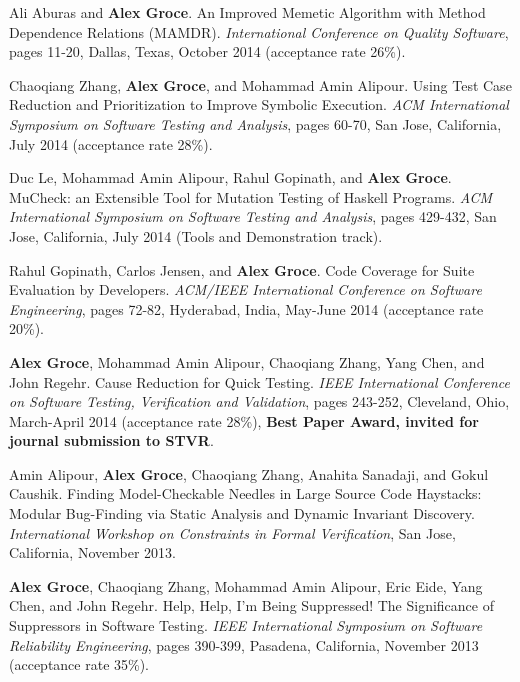 \documentclass[ComputerScience]{vita}
\begin{document}
\begin{vita}
\begin{Refereed Conference and Workshop Publications}
\item
Ali Aburas and {\bf Alex Groce}.
\newblock An Improved Memetic Algorithm with Method Dependence Relations (MAMDR).
\newblock \emph{International Conference on Quality Software}, pages 11-20, Dallas, Texas, October 2014 (acceptance rate 26\%).

\item
Chaoqiang Zhang, {\bf Alex Groce}, and Mohammad Amin Alipour.
\newblock Using Test Case Reduction and Prioritization to Improve Symbolic Execution.
\newblock \emph{ACM International Symposium on Software Testing and Analysis}, pages 60-70, San Jose, California, July 2014 (acceptance rate 28\%).

\item
Duc Le, Mohammad Amin Alipour, Rahul Gopinath, and {\bf Alex Groce}.
\newblock MuCheck: an Extensible Tool for Mutation Testing of Haskell Programs.
\newblock \emph{ACM International Symposium on Software Testing and Analysis}, pages 429-432, San Jose, California, July 2014 (Tools and Demonstration track). 

\item
Rahul Gopinath, Carlos Jensen, and {\bf Alex Groce}.
\newblock Code Coverage for Suite Evaluation by Developers.
\newblock \emph{ACM/IEEE International Conference on Software Engineering}, pages 72-82, Hyderabad, India, May-June 2014 (acceptance rate 20\%). 

\item
{\bf Alex Groce}, Mohammad Amin Alipour, Chaoqiang Zhang, Yang Chen, and John Regehr.
\newblock Cause Reduction for Quick Testing.
\newblock \emph {IEEE International Conference on Software Testing, Verification and Validation}, pages 243-252, Cleveland, Ohio, March-April 2014 (acceptance rate 28\%), {\bf Best Paper Award, invited for journal submission to STVR}.

\item
Amin Alipour, {\bf Alex Groce}, Chaoqiang Zhang, Anahita Sanadaji, and Gokul Caushik.
\newblock Finding Model-Checkable Needles in Large Source Code Haystacks: Modular Bug-Finding via Static Analysis and Dynamic Invariant Discovery.
\newblock \emph{International Workshop on Constraints in Formal Verification}, San Jose, California, November 2013.

\item {\bf Alex Groce}, Chaoqiang Zhang, Mohammad Amin Alipour, Eric Eide, Yang Chen, and John Regehr.
\newblock Help, Help, I'm Being Suppressed! The Significance of Suppressors in Software Testing.
\newblock \emph{IEEE International Symposium on Software Reliability Engineering}, pages 390-399, Pasadena, California, November 2013 (acceptance rate 35\%).


\end{Refereed Conference and Workshop Publications}
\end{vita}
\end{document}
